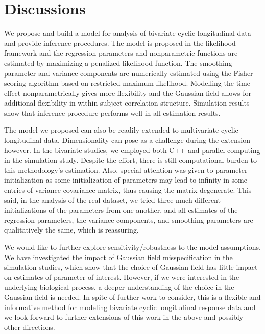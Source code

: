\documentclass[12pt, notitlepage]{article}
\begin{document}
\section{Discussions} \label{conclu}

We propose and build a model for analysis of bivariate cyclic longitudinal data and provide inference procedures. The model is proposed in the likelihood framework and the regression parameters and nonparametric functions are estimated by maximizing a penalized likelihood function.  
The smoothing parameter and variance components are numerically estimated using the Fisher-scoring algorithm based on restricted maximum likelihood.
Modelling the time effect nonparametrically gives more flexibility and the Gaussian field allows for additional flexibility in within-subject correlation structure. Simulation results show that inference procedure performs well in all estimation results.

The model we proposed can also be readily extended to multivariate cyclic longitudinal data.   
Dimensionality can pose as a challenge during the extension however. In the bivariate studies, we employed both C++ and parallel computing in the simulation study. Despite the effort, there is still computational burden to this methodology's estimation. Also, special attention was given to parameter initialization as some initialization of parameters may lead to infinity in some entries of variance-covariance matrix, thus causing the matrix degenerate. This said, in the analysis of the real dataset, we tried three much different initializations of the parameters from one another, and all estimates of the regression parameters, the variance components, and smoothing parameters are qualitatively the same, which is reassuring. 


We would like to further explore sensitivity/robustness to the model assumptions. We have investigated the impact of Gaussian field misspecification in the simulation studies, which show that the choice of Gaussian field has little impact on estimates of parameter of interest. However, if we were interested in the underlying biological process, a deeper understanding of the choice in the Gaussian field is needed. 
In spite of further work to consider, this is a flexible and informative method for modeling bivariate cyclic longitudinal response data and we look forward to further extensions of this work in the above and possibly other directions.


%
%
%
\end{document}
